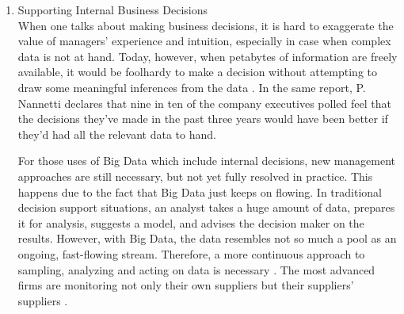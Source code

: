 \documentclass[runningheads]{llncs}
\begin{document}
\begin{enumerate}
\item Supporting Internal Business Decisions\\

When one talks about making business decisions, it is hard to exaggerate the value of managers' experience and intuition, especially in case when complex data is not at hand. Today, however, when petabytes of information
are freely available, it would be foolhardy to make a decision without attempting to draw some meaningful inferences from the data \cite{NANNETTI}. In the same report, P. Nannetti declares that nine in ten of the company executives polled feel that the decisions they've made in the past three years would have been better if they'd had all the relevant data to hand. 

For those uses of Big Data which include internal decisions, new management approaches are still necessary, but not yet fully resolved in practice. This happens due to the fact that Big Data just keeps on flowing. In traditional decision support situations, an analyst takes a huge amount of data, prepares it for analysis, suggests a model, and advises the decision maker on the results. However, with Big Data, the data resembles not so much a pool as an ongoing, fast-flowing stream. Therefore, a more continuous approach to sampling, analyzing and acting on data is necessary \cite{EMERALD}. The most advanced firms are monitoring not only their own suppliers but their suppliers' suppliers \cite{DAVENPORT}.

\end{enumerate}
\end{document}
